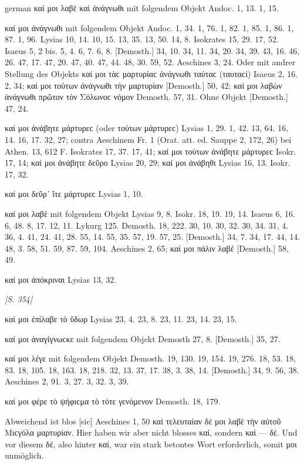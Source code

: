 \begin{otherlanguage*}{german}
καί μοι λαβὲ καὶ ἀνάγνωθι mit folgendem Objekt Andoc. 1, 13. 1, 15.

καί μοι ἀνάγνωθι mit folgendem Objekt Andoc. 1, 34. 1, 76. 1, 82. 1, 85. 1, 86. 1, 87. 1, 96. Lysias 10, 14. 10, 15. 13, 35. 13, 50. 14, 8. Isokrates 15, 29. 17, 52. Isaeus 5, 2 bis. 5, 4. 6, 7. 6, 8. [Demosth.] 34, 10. 34, 11. 34, 20. 34, 39. 43, 16. 46, 26. 47, 17. 47, 20. 47, 40. 47, 44. 48, 30. 59, 52. Aeschines 3, 24. Oder mit andrer Stellung des Objekts καί μοι τὰϲ μαρτυρίαϲ ἀνάγνωθι ταύταϲ (ταυταϲί) Isaeus 2, 16. 2, 34; καί μοι τούτων ἀνάγνωθι τὴν μαρτυρίαν [Demosth.] 50, 42; καί μοι λαβὼν ἀνάγνωθι πρῶτον τὸν Σόλωνοϲ νόμον Demosth. 57, 31. Ohne Objekt [Demosth.] 47, 24.

καί μοι ἀνάβητε μάρτυρεϲ (oder τούτων μάρτυρεϲ) Lysias 1, 29. 1, 42. 13, 64. 16, 14. 16, 17. 32, 27; contra Aeschinem Fr. 1 (Orat. att. ed. Sauppe 2, 172, 26) bei Athen. 13, 612 F. Isokrates 17, 37. 17, 41; καί μοι τούτων ἀνάβητε μάρτυρεϲ Isokr. 17, 14; καί μοι ἀνάβητε δεῦρο Lysias 20, 29; καί μοι ἀνάβηθι Lysias 16, 13. Isokr. 17, 32.

καί μοι δεῦρ᾽ ἴτε μάρτυρεϲ Lysias 1, 10.

καί μοι λαβέ mit folgendem Objekt Lysias 9, 8. Isokr. 18, 19. 19, 14. Isaeus 6, 16. 6, 48. 8, 17. 12, 11. Lykurg 125. Demosth. 18, 222. 30, 10. 30, 32. 30, 34. 31, 4. 36, 4. 41, 24. 41, 28. 55, 14. 55, 35. 57, 19. 57, 25. [Demosth.] 34, 7. 34, 17. 44, 14. 48, 3. 58, 51. 59, 87. 59, 104. Aeschines 2, 65; καί μοι πάλιν λαβέ [Demosth.] 58, 49.

καί μοι ἀπόκριναι Lysias 13, 32.

\hypertarget{p354}{\emph{[S. 354]}}\label{p354} καί μοι ἐπίλαβε τὸ ὕδωρ Lysias 23, 4. 23, 8. 23, 11. 23, 14. 23, 15.

καί μοι ἀναγίγνωϲκε mit folgendem Objekt Demosth 27, 8. [Demosth.] 35, 27.

καί μοι λέγε mit folgendem Objekt Demosth. 19, 130. 19, 154. 19, 276. 18, 53. 18, 83. 18, 105. 18, 163. 18, 218. 32, 13. 37, 17. 38, 3. 38, 14. [Demosth.] 34, 9. 56, 38. Aeschines 2, 91. 3, 27. 3, 32. 3, 39.

καί μοι φέρε τὸ ψήφιϲμα τὸ τότε γενόμενον Demosth. 18, 179.

Abweichend ist blos [sic] Aeschines 1, 50 καὶ τελευταίαν δέ μοι λαβὲ τὴν αὐτοῦ Μιϲγόλα μαρτυρίαν. Hier haben wir aber nicht blosses καί, sondern καὶ — δέ. Und vor diesem δέ, also hinter καί, war ein stark betontes Wort erforderlich, somit μοι unmöglich.


\end{otherlanguage*}
